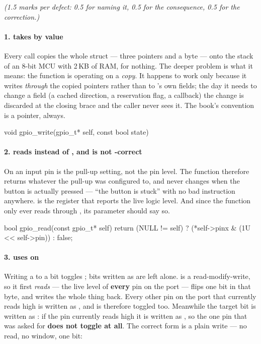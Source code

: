 \textit{(1.5 marks per defect: 0.5 for naming it, 0.5 for the consequence, 0.5 for the
correction.)}

\paragraph{1.  takes  by value}
Every call copies the whole struct --- three pointers and a byte --- onto the stack of an 8-bit MCU
with 2\,KB of RAM, for nothing. The deeper problem is what it means: the function is operating on a
\emph{copy}. It happens to work only because it writes \emph{through} the copied pointers rather
than to 's own fields; the day it needs to change a field (a cached direction, a
reservation flag, a callback) the change is discarded at the closing brace and the caller never sees
it. The book's convention is a pointer, always.

\begin{ccode}
void gpio_write(gpio_t* self, const bool state)
\end{ccode}

\paragraph{2.  reads  instead of , and is not
-correct}
On an input pin  is the pull-up setting, not the pin level. The function therefore
returns whatever the pull-up was configured to, and never changes when the button is actually
pressed --- ``the button is stuck'' with no bad instruction anywhere.  is the register
that reports the live logic level. And since the function only ever reads through , its
parameter should say so.

\begin{ccode}
bool gpio_read(const gpio_t* self)
{
    return (NULL != self) ? (*self->pinx & (1U << self->pin)) : false;
}
\end{ccode}

\paragraph{3.  uses \code{^=} on }
Writing a  to a  bit toggles ; bits written as  are left
alone. \code{^=} is a read-modify-write, so it first \emph{reads}  --- the live level of
\textbf{every} pin on the port --- flips one bit in that byte, and writes the whole thing back.
Every other pin on the port that currently reads high is written as , and is therefore
toggled too. Meanwhile the target bit is written as : if the pin currently reads
high it is written as , so the one pin that was asked for \textbf{does not toggle at all}.
The correct form is a plain write --- no read, no window, one bit:

